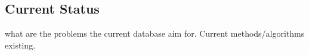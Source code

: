 \subsection{Current Status}
what are the problems the current database aim for.
Current methods/algorithms existing.

%
